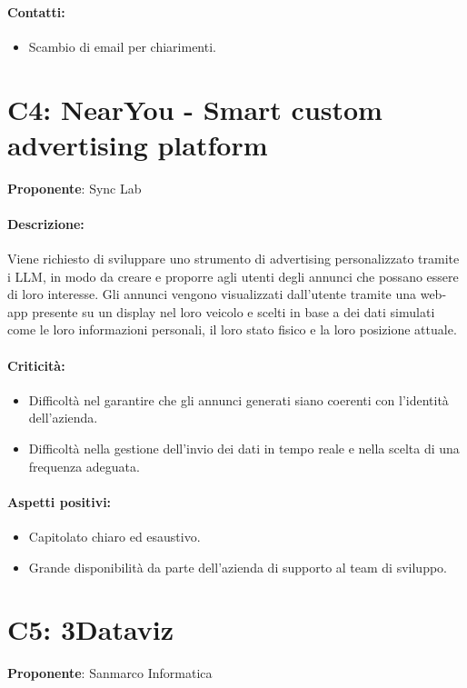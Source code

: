 \documentclass{TWDocumentNoVersion}
\begin{document}
    \paragraph{Contatti:}
    \begin{itemize}
        \item Scambio di email per chiarimenti.
    \end{itemize}

    \section*{C4: NearYou - Smart custom advertising platform}
    {\textbf{Proponente}: Sync Lab}
    \paragraph{Descrizione:\\}
    {Viene richiesto di sviluppare uno strumento di advertising personalizzato tramite i LLM, in modo da creare e proporre agli utenti degli annunci che possano essere di loro interesse. Gli annunci vengono visualizzati dall'utente tramite una web-app presente su un display nel loro veicolo e scelti in base a dei dati simulati come le loro informazioni personali, il loro stato fisico e la loro posizione attuale. }
    \paragraph{Criticità:}
    \begin{itemize}
        \item Difficoltà nel garantire che gli annunci generati siano coerenti con l'identità dell'azienda.
        \item Difficoltà nella gestione dell'invio dei dati in tempo reale e nella scelta di una frequenza adeguata.
    \end{itemize}
    \paragraph{Aspetti positivi:}
    \begin{itemize}
        \item Capitolato chiaro ed esaustivo.
        \item Grande disponibilità da parte dell'azienda di supporto al team di sviluppo.
    \end{itemize}

    \section*{C5: 3Dataviz}
    {\textbf{Proponente}: Sanmarco Informatica}
\end{document}
